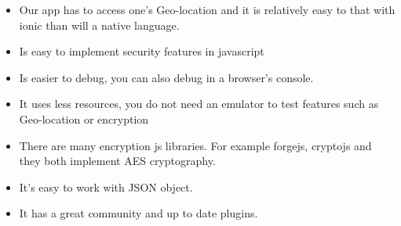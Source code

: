 \documentclass[a4paper,12pt]{article}
\begin{document}
\begin{itemize}
\begin{itemize}
\item Our app has to access one’s Geo-location and it is relatively easy to that with ionic than will a native language.
\item Is easy to implement security features in javascript
\item Is easier to debug, you can also debug in a browser’s console.
\item It uses less resources, you do not need an emulator to test features such as Geo-location or encryption
\item There are many encryption js libraries. For example forgejs, cryptojs and they both implement AES cryptography.
\item It's easy to work with JSON object.
\item It has a great community and up to date plugins.
	\end{itemize}
\end{itemize}
\end{document}
